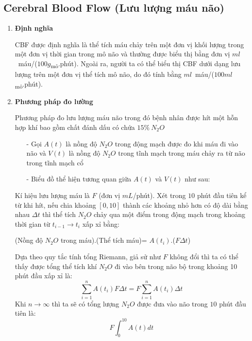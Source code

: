 \documentclass[12pt,a4paper]{article}
\begin{document}
\subsection{Cerebral Blood Flow (Lưu lượng máu não)}
\begin{enumerate}[a/]
	\item \textbf{Định nghĩa}
	      \begin{flushleft}
		      CBF được định nghĩa là thể tích máu chảy trên một đơn vị khối lượng trong
		      một đơn vị thời gian trong mô não và thường được biểu thị bằng đơn vị $ml$\ máu/($100g$\textsubscript{mô}.phút).
		      Ngoài ra, người ta có thể biểu thị CBF dưới dạng lưu lượng trên một đơn vị thể tích mô não,
		      do đó tính bằng $ml$\ máu/($100ml$\textsubscript{mô}.phút).
	      \end{flushleft}
	\item \textbf{Phương pháp đo lường}
	      \begin{flushleft}
		      Phương pháp đo lưu lượng máu não trong đó bệnh nhân được
		      hít một hỗn hợp khí bao gồm chất đánh dấu có chứa $15\%\ N_2O$
		      \begin{itemize}
			      \item[-] 	Gọi $A(t)$ là nồng độ $N_2O$ trong động mạch được đo khi máu đi vào não và $V(t)$ là nồng độ $N_2O$ trong tĩnh mạch trong máu chảy ra từ não trong tĩnh mạch cổ
			      \item[-] 	Biểu đồ thể hiện tương quan giữa $A(t)$ và $V(t)$ như sau:
		      \end{itemize}
		      Kí hiệu lưu lượng máu là $F$ (đơn vị $mL$/phút). Xét trong $10$ phút đầu tiên
		      kể từ khi hít, nếu chia khoảng $\left[0,10\right]$ thành các khoảng nhỏ hơn có độ dài bằng nhau $\Delta t$ thì
		      thể tích $N_2O$ chảy qua một điểm trong động mạch trong khoảng thời gian từ $t_{i-1} \to t_i$ xấp xỉ bằng:
	      \end{flushleft}
	      \begin{center}
		      (Nồng độ $N_2O$ trong máu).(Thể tích máu)= $A(t_i)$.($F \Delta t$)
	      \end{center}
	      \begin{flushleft}
		      Dựa theo quy tắc tính tổng Riemann, giả sử như $F$ không đổi thì ta có thể thấy được tổng thể tích khí $N_2O$ đi vào bên trong não bộ trong khoảng 10 phút đầu xấp xỉ là:
		      $$\sum_{i = 1}^{n} A(t_i)F\Delta t = F \sum_{i = 1}^{n} A(t_i) \Delta t$$
		      Khi $n \to \infty$ thì ta sẽ có tổng lượng $N_2O$ được đưa vào não trong $10$ phút đầu tiên là:
		      $$F \int_{0}^{10} A(t)dt$$

\end{flushleft}
\end{enumerate}
\end{document}
